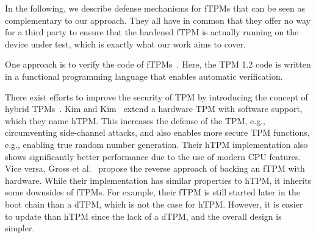 

In the following, we describe defense mechanisms for fTPMs that can be seen as complementary to our approach. They all have in common that they offer no way for a third party to ensure that the hardened fTPM is actually running on the device under test, which is exactly what our work aims to cover.

One approach is to verify the code of fTPMs~\cite{Mukhamedov2013}. Here, the TPM 1.2 code is written in a functional programming language that enables automatic verification.

There exist efforts to improve the security of TPM by introducing the concept of hybrid TPMs~\cite{Kim2019, Gross2021}. Kim and Kim~\cite{Kim2019} extend a hardware TPM with software support, which they name hTPM\@. This increases the defense of the TPM, e.g., circumventing side-channel attacks, and also enables more secure TPM functions, e.g., enabling true random number generation. Their hTPM implementation also shows significantly better performance due to the use of modern CPU features.
Vice versa, Gross et al.~\cite{Gross2021} propose the reverse approach of backing an fTPM with hardware. While their implementation has similar properties to hTPM, it inherits some downsides of fTPMs. For example, their fTPM is still started later in the boot chain than a dTPM, which is not the case for hTPM\@. However, it is easier to update than hTPM since the lack of a dTPM, and the overall design is simpler.






